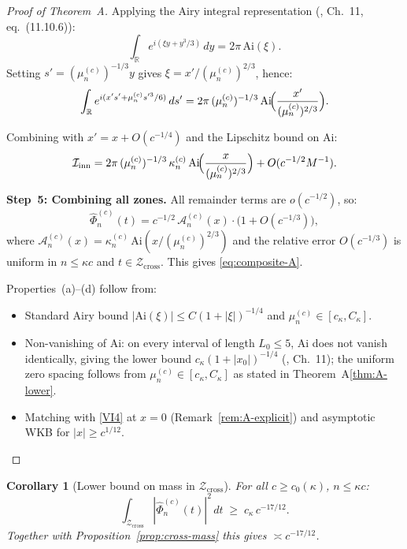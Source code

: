\documentclass[12pt,a4paper]{amsart}
\newtheorem{corollary}[theorem]{Corollary}
\theoremstyle{definition}
\theoremstyle{remark}
\newcommand{\Ai}{\mathrm{Ai}}
\newcommand{\Zcross}{\mathcal{Z}_{\mathrm{cross}}}
\begin{document}
\begin{proof}[Proof of Theorem~A]
Applying the Airy integral representation
\textup{(\cite{Olver1974}, Ch.~11, eq.~(11.10.6))}:
\begin{equation}
\label{eq:airy-integral}
  \int_{\mathbb{R}}
  e^{i(\xi y + y^3/3)}\,dy
  = 2\pi\,\Ai(\xi).
\end{equation}
Setting $s' = (\mu_n^{(c)})^{-1/3}y$ gives
$\xi = x'/(\mu_n^{(c)})^{2/3}$, hence:
\[
  \int_{\mathbb{R}}
  e^{i(x's' + \mu_n^{(c)}s'^3/6)}\,ds'
  = 2\pi\,(\mu_n^{(c)})^{-1/3}\,
    \Ai\!\Bigl(\frac{x'}{(\mu_n^{(c)})^{2/3}}\Bigr).
\]

Combining with $x' = x + O(c^{-1/4})$
and the Lipschitz bound on $\Ai$:
\[
  \mathcal{I}_{\mathrm{inn}}
  = 2\pi\,(\mu_n^{(c)})^{-1/3}\,\kappa_n^{(c)}\,
    \Ai\!\Bigl(\frac{x}{(\mu_n^{(c)})^{2/3}}\Bigr)
  + O(c^{-1/2}M^{-1}).
\]

\medskip
\noindent\textbf{Step~5: Combining all zones.}
All remainder terms are $o(c^{-1/2})$, so:
\[
  \widehat{\Phi}_n^{(c)}(t)
  = c^{-1/2}\,\mathcal{A}_n^{(c)}(x)
  \cdot\bigl(1 + O(c^{-1/3})\bigr),
\]
where $\mathcal{A}_n^{(c)}(x)
= \kappa_n^{(c)}\,\Ai(x/(\mu_n^{(c)})^{2/3})$
and the relative error $O(c^{-1/3})$ is uniform
in $n \le \kappa c$ and $t \in \Zcross$.
This gives \eqref{eq:composite-A}.

Properties~(a)--(d) follow from:
\begin{itemize}
  \item[(a)] Standard Airy bound
        $|\Ai(\xi)| \le C(1+|\xi|)^{-1/4}$
        and $\mu_n^{(c)} \in [c_\kappa, C_\kappa]$.
  \item[(b)] Non-vanishing of $\Ai$:
        on every interval of length $L_0 \le 5$,
        $\Ai$ does not vanish identically,
        giving the lower bound
        $c_\kappa(1+|x_0|)^{-1/4}$
        (\cite{Olver1974}, Ch.~11);
        the uniform zero spacing follows from
        $\mu_n^{(c)} \in [c_\kappa, C_\kappa]$
        as stated in Theorem~A\eqref{thm:A-lower}.
  \item[(c),(d)] Matching with \eqref{VI4}
        at $x = 0$ (Remark~\ref{rem:A-explicit})
        and asymptotic WKB for $|x| \ge c^{1/12}$.
\end{itemize}
\end{proof}

\begin{corollary}[Lower bound on mass in $\Zcross$]
\label{cor:cross-mass-lower}
For all $c \ge c_0(\kappa)$, $n \le \kappa c$:
\[
\int_{\Zcross}|\widehat{\Phi}_n^{(c)}(t)|^2\,dt
\;\ge\; c_\kappa\,c^{-17/12}.
\]
Together with Proposition~\ref{prop:cross-mass}
this gives $\asymp c^{-17/12}$.
\end{corollary}
\end{document}
